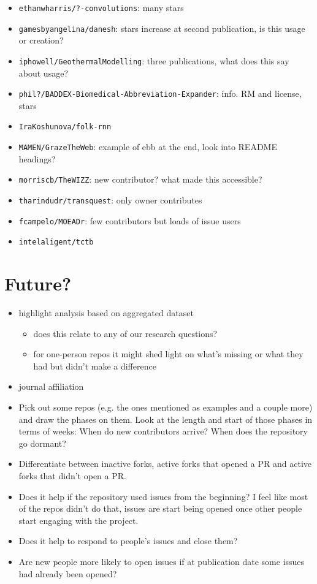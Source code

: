 \documentclass[10pt,a4paper]{scrartcl}
\begin{document}
\begin{itemize}
    \item \verb|ethanwharris/?-convolutions|: many stars
    \item \verb|gamesbyangelina/danesh|: stars increase at second publication, is this usage or creation?
    \item \verb|iphowell/GeothermalModelling|: three publications, what does this say about usage?
    \item \verb|phil?/BADDEX-Biomedical-Abbreviation-Expander|: info. RM and license, stars
    \item \verb|IraKoshunova/folk-rnn|
    \item \verb|MAMEN/GrazeTheWeb|: example of ebb at the end, look into README headings?
    \item \verb|morriscb/TheWIZZ|: new contributor? what made this accessible?
    \item \verb|tharindudr/transquest|: only owner contributes
    \item \verb|fcampelo/MOEADr|: few contributors but loads of issue users
    \item \verb|intelaligent/tctb|
\end{itemize}

\section*{Future?}

\begin{itemize}
    \item highlight analysis based on aggregated dataset
    \begin{itemize}
        \item does this relate to any of our research questions?
        \item for one-person repos it might shed light on what's missing or what they had but didn't make a difference
    \end{itemize}
    \item journal affiliation
    \item Pick out some repos (e.g. the ones mentioned as examples and a couple more) and draw the phases on them. Look at the length and start of those phases in terms of weeks: When do new contributors arrive? When does the repository go dormant?
    \item Differentiate between inactive forks, active forks that opened a PR and active forks that didn't open a PR.
    \item Does it help if the repository used issues from the beginning? I feel like most of the repos didn't do that, issues are start being opened once other people start engaging with the project.
    \item Does it help to respond to people's issues and close them?
    \item Are new people more likely to open issues if at publication date some issues had already been opened?
\end{itemize}

%
%
\end{document}
